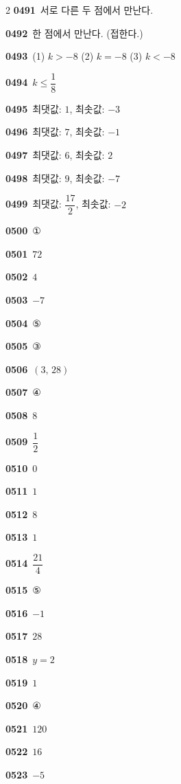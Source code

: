 \documentclass[10pt,a4paper]{article}
\begin{document}
\begin{multicols}{2}
\noindent\textbf{0491}\ 서로 다른 두 점에서 만난다.\par
\noindent\textbf{0492}\ 한 점에서 만난다. (접한다.)\par
\noindent\textbf{0493}\ (1) $k>-8$ \quad (2) $k=-8$ \quad (3) $k<-8$\par
\noindent\textbf{0494}\ $k\le\dfrac{1}{8}$\par
\noindent\textbf{0495}\ 최댓값: $1$, 최솟값: $-3$\par
\noindent\textbf{0496}\ 최댓값: $7$, 최솟값: $-1$\par
\noindent\textbf{0497}\ 최댓값: $6$, 최솟값: $2$\par
\noindent\textbf{0498}\ 최댓값: $9$, 최솟값: $-7$\par
\noindent\textbf{0499}\ 최댓값: $\dfrac{17}{2}$, 최솟값: $-2$\par
\noindent\textbf{0500}\ ①\par
\noindent\textbf{0501}\ $72$\par
\noindent\textbf{0502}\ $4$\par
\noindent\textbf{0503}\ $-7$\par
\noindent\textbf{0504}\ ⑤\par
\noindent\textbf{0505}\ ③\par
\noindent\textbf{0506}\ $(3,\,28)$\par
\noindent\textbf{0507}\ ④\par
\noindent\textbf{0508}\ $8$\par
\noindent\textbf{0509}\ $\dfrac{1}{2}$\par
\noindent\textbf{0510}\ $0$\par
\noindent\textbf{0511}\ $1$\par
\noindent\textbf{0512}\ $8$\par
\noindent\textbf{0513}\ $1$\par
\noindent\textbf{0514}\ $\dfrac{21}{4}$\par
\noindent\textbf{0515}\ ⑤\par
\noindent\textbf{0516}\ $-1$\par
\noindent\textbf{0517}\ $28$\par
\noindent\textbf{0518}\ $y=2$\par
\noindent\textbf{0519}\ $1$\par
\noindent\textbf{0520}\ ④\par
\noindent\textbf{0521}\ $120$\par
\noindent\textbf{0522}\ $16$\par
\noindent\textbf{0523}\ $-5$\par

\end{multicols}
\end{document}
